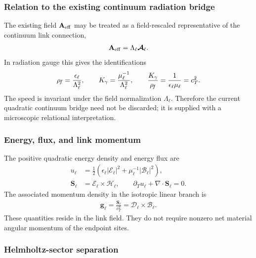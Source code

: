 \subsubsection{Relation to the existing continuum radiation bridge}

The existing field $\mathbf A_{\rm eff}$ may be treated as a field-rescaled
representative of the continuum link connection,
\begin{align}
    \mathbf A_{\rm eff}
    =
    \Lambda_\ell\boldsymbol{\mathcal A}_\ell.
\end{align}
In radiation gauge this gives the identifications
\begin{align}
    \rho_{\!f}
    =
    \frac{\epsilon_\ell}{\Lambda_\ell^2},
    \qquad
    K_\gamma
    =
    \frac{\mu_\ell^{-1}}{\Lambda_\ell^2},
    \qquad
    \frac{K_\gamma}{\rho_{\!f}}
    =
    \frac{1}{\epsilon_\ell\mu_\ell}
    =c_T^2.
    \label{eq:rt_link_to_Aeff_normalization}
\end{align}
The speed is invariant under the field normalization $\Lambda_\ell$.  Therefore
the current quadratic continuum bridge need not be discarded; it is supplied
with a microscopic relational interpretation.

\subsubsection{Energy, flux, and link momentum}

The positive quadratic energy density and energy flux are
\begin{align}
    u_\ell
    &=
    \frac12
    \left(
        \epsilon_\ell|\boldsymbol{\mathcal E}_\ell|^2
        +
        \mu_\ell^{-1}|\boldsymbol{\mathcal B}_\ell|^2
    \right),
    \\
    \mathbf S_\ell
    &=
    \boldsymbol{\mathcal E}_\ell
    \times
    \boldsymbol{\mathcal H}_\ell,
    \qquad
    \partial_Tu_\ell+\nabla\cdot\mathbf S_\ell=0.
    \label{eq:rt_link_energy_flux}
\end{align}
The associated momentum density in the isotropic linear branch is
\begin{align}
    \mathbf g_\ell
    =
    \frac{\mathbf S_\ell}{c_T^2}
    =
    \boldsymbol{\mathcal D}_\ell
    \times
    \boldsymbol{\mathcal B}_\ell.
    \label{eq:rt_link_momentum_density}
\end{align}
These quantities reside in the link field.  They do not require nonzero net
material angular momentum of the endpoint sites.

\subsubsection{Helmholtz-sector separation}

